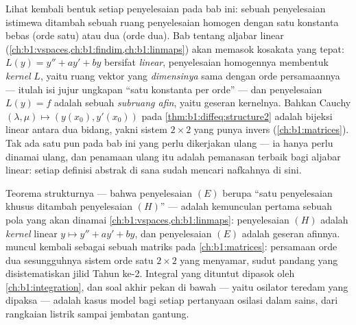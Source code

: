 \begin{remark}\label{rem:b1:diffeq:interlude}
Lihat kembali bentuk setiap  penyelesaian pada bab ini: sebuah
penyelesaian istimewa ditambah sebuah ruang penyelesaian homogen dengan satu
konstanta bebas (orde satu) atau dua (orde dua). Bab tentang
aljabar linear (\cref{ch:b1:vspaces,ch:b1:findim,ch:b1:linmaps})
akan memasok kosakata yang tepat:  $L(y) = y'' + ay' + by$
bersifat \emph{linear}, penyelesaian homogennya membentuk \emph{kernel}
$L$, yaitu ruang vektor yang \emph{dimensinya} sama dengan orde persamaannya
--- itulah isi jujur ungkapan ``satu konstanta per orde'' --- dan
 penyelesaian $L(y) = f$ adalah sebuah \emph{subruang afin}, yaitu
geseran kernelnya. Bahkan  Cauchy $(\lambda, \mu)
\mapsto (y(x_0), y'(x_0))$ pada \cref{thm:b1:diffeq:structure2} adalah
bijeksi linear antara dua bidang, yakni sistem $2
\times 2$ yang punya invers (\cref{ch:b1:matrices}). Tak ada satu pun pada bab ini
yang perlu dikerjakan ulang --- ia hanya perlu dinamai ulang, dan
penamaan ulang itu adalah pemanasan terbaik bagi aljabar linear:
setiap definisi abstrak di sana sudah mencari nafkahnya
di sini.
\end{remark}

\begin{remark}\label{rem:b1:diffeq:whereused}
Teorema strukturnya --- bahwa penyelesaian $(E)$ berupa ``satu penyelesaian
khusus ditambah penyelesaian $(H)$'' --- adalah kemunculan pertama
sebuah pola yang akan dinamai \cref{ch:b1:vspaces,ch:b1:linmaps}:
 penyelesaian $(H)$ adalah \emph{kernel}  linear $y
\mapsto y'' + ay' + by$, dan  penyelesaian $(E)$ adalah
geseran afinnya.  muncul kembali sebagai
 sebuah matriks pada \cref{ch:b1:matrices}:
persamaan orde dua sesungguhnya sistem orde satu $2 \times 2$ yang
menyamar, sudut pandang yang disistematiskan jilid Tahun ke-2. Integral
yang dituntut  dipasok oleh
\cref{ch:b1:integration}, dan soal akhir pekan di bawah --- yaitu
osilator teredam yang dipaksa --- adalah kasus model bagi setiap
pertanyaan osilasi dalam sains, dari rangkaian listrik sampai jembatan
gantung.
\end{remark}

